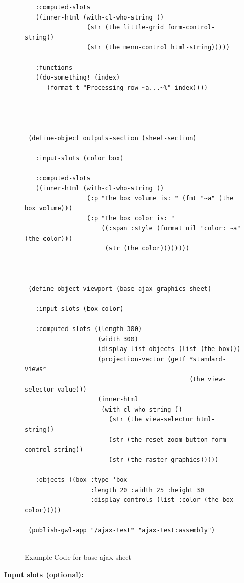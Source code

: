 \documentclass [11pt]{book}
\begin{document}
\begin{itemize}
\begin{figure}
\begin{lrbox}{\boxedverb}
\begin{minipage}{\linewidth}
{\begin{verbatim}
   :computed-slots 
   ((inner-html (with-cl-who-string ()
                 (str (the little-grid form-control-string))
                 (str (the menu-control html-string)))))
   
   :functions
   ((do-something! (index)
      (format t "Processing row ~a...~%" index))))




 (define-object outputs-section (sheet-section)
   
   :input-slots (color box)
  
   :computed-slots 
   ((inner-html (with-cl-who-string ()
                 (:p "The box volume is: " (fmt "~a" (the box volume)))
                 (:p "The box color is: " 
                     ((:span :style (format nil "color: ~a" (the color)))
                      (str (the color))))))))



 (define-object viewport (base-ajax-graphics-sheet)
  
   :input-slots (box-color)

   :computed-slots ((length 300)
                    (width 300)
                    (display-list-objects (list (the box)))
                    (projection-vector (getf *standard-views* 
                                             (the view-selector value)))
                    (inner-html
                     (with-cl-who-string ()
                       (str (the view-selector html-string))
                       (str (the reset-zoom-button form-control-string))
                       (str (the raster-graphics)))))
  
   :objects ((box :type 'box 
                  :length 20 :width 25 :height 30
                  :display-controls (list :color (the box-color)))))
   
 (publish-gwl-app "/ajax-test" "ajax-test:assembly")


\end{verbatim}}
\end{minipage}
\end{lrbox}
\fbox{\usebox{\boxedverb}}

\caption{Example Code for base-ajax-sheet}

\label{fig:example-code-base-ajax-sheet}

\end{figure}





\textbf{
\underline{Input slots (optional):}}


\end{itemize}
\end{document}
